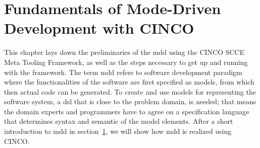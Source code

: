 
\chapter{Fundamentals of Mode-Driven Development with CINCO}\label{ch:Basis}

This chapter lays down the preliminaries of the \acrfull{mdd} using the CINCO SCCE Meta Tooling Framework, as well as the steps necessary to get up and running with the framework.
The term \acrshort{mdd} refers to software development paradigm where the functionalities of the software are first specified as models, from which then actual code can be generated.
To create and use models for representing the software system, a \acrfull{dsl} that is close to the problem domain, is needed; that means the domain experts and programmers have to agree on a specification language that determines syntax and semantic of the model elements. 
After a short introduction to \acrfull{mdd} in section~\hyperref[]{1}, we will show how \acrshort{mdd} is realized using CINCO\@.
